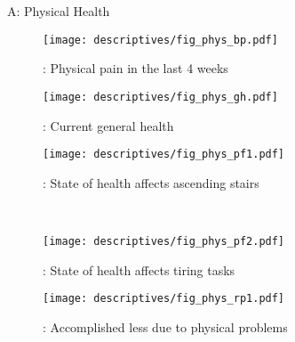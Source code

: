 



\begin{figure}[ht!]
  A: Physical Health
  \\  %
  \begin{subfigure}{.30\textwidth}
    \texttt{[image: descriptives/fig\_phys\_bp.pdf]}
    \caption{: Physical pain in the last 4 weeks}
    \label{fig:bp}
\end{subfigure}\hfill%
  \begin{subfigure}{.30\textwidth}
    \texttt{[image: descriptives/fig\_phys\_gh.pdf]}
    \caption{: Current general health \phantom{text to break line}}
    \label{fig:gh}
\end{subfigure}\hfill%
  \begin{subfigure}{.30\textwidth}
    \texttt{[image: descriptives/fig\_phys\_pf1.pdf]}
    \caption{: State of health affects ascending stairs}
    \label{fig:pf1}
\end{subfigure}\hfill%
  \\  %
  \begin{subfigure}{.30\textwidth}
    \texttt{[image: descriptives/fig\_phys\_pf2.pdf]}
    \caption{: State of health affects tiring tasks}
    \label{fig:pf2}
  \end{subfigure}\hfill%
  \begin{subfigure}{.30\textwidth}
    \texttt{[image: descriptives/fig\_phys\_rp1.pdf]}
    \caption{: Accomplished less due to physical problems}
    \label{fig:rp1}
  \end{subfigure}\hfill%
  \begin{subfigure}{.30\textwidth}

\end{subfigure}
\end{figure}
